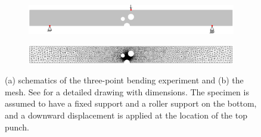 \begin{figure}[!htb]
  \centering
  \begin{subfigure}[b]{0.9\textwidth}
    \centering
    \includegraphics[width=\textwidth,scale=0.5]{Chapter5/figures/3pb/3pb_bc}
    \caption{}
  \end{subfigure}
  \begin{subfigure}[b]{0.9\textwidth}
    \centering
    \includegraphics[width=\textwidth,scale=0.5]{Chapter5/figures/3pb/3pb_mesh}
    \caption{}
    \label{fig: Chapter5/3pb/3pb_mesh}
  \end{subfigure}
  \caption{(a) schematics of the three-point bending experiment and (b) the mesh. See \cite{kubik2019ductile} for a detailed drawing with dimensions. The specimen is assumed to have a fixed support and a roller support on the bottom, and a downward displacement is applied at the location of the top punch.}
  \label{fig: Chapter5/3pb/3pb}
\end{figure}
